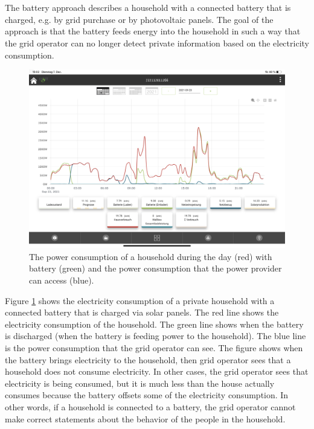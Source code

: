 \\
\\
The battery approach describes a household with a connected battery that is charged, e.g. by grid purchase or by photovoltaic panels. The goal of the approach is that the battery feeds energy into the household in such a way that the grid operator can no longer detect private information based on the electricity consumption. \\
\begin{figure}[tbp]
  \centering
  \includegraphics[width=1\textwidth]{images/Battery.jpg}
  \caption[Battery Consumption Figure]{The power consumption of a household during the day (red) with battery (green) and the power consumption that the power provider can access (blue).}
  \label{fig:Battery}
\end{figure}
Figure \ref{fig:Battery} shows the electricity consumption of a private household with a connected battery that is charged via solar panels. The red line shows the electricity consumption of the household. The green line shows when the battery is discharged (when the battery is feeding power to the household). The blue line is the power consumption that the grid operator can see. The figure shows when the battery brings electricity to the household, then grid operator sees that a household does not consume electricity. In other cases, the grid operator sees that electricity is being consumed, but it is much less than the house actually consumes because the battery offsets some of the electricity consumption. In other words, if a household is connected to a battery, the grid operator cannot make correct statements about the behavior of the people in the household. \\
